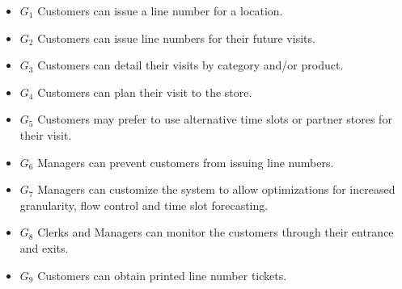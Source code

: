 \begin{itemize}
    \item \textbf{$G_{1}$} Customers can issue a line number for a location.
    \item \textbf{$G_{2}$} Customers can issue line numbers for their future visits.
    \item \textbf{$G_{3}$} Customers can detail their visits by category and/or product.
    \item \textbf{$G_{4}$} Customers can plan their visit to the store. %
    \item \textbf{$G_{5}$} Customers may prefer to use alternative time slots or partner stores for their visit.
    \item \textbf{$G_{6}$} Managers can prevent customers from issuing line numbers. %
    \item \textbf{$G_{7}$} Managers can customize the system to allow optimizations for increased granularity, flow control and time slot forecasting. %
    \item \textbf{$G_{8}$} Clerks and Managers can monitor the customers through their entrance and exits.
    \item \textbf{$G_{9}$} Customers can obtain printed line number tickets.
\end{itemize}



